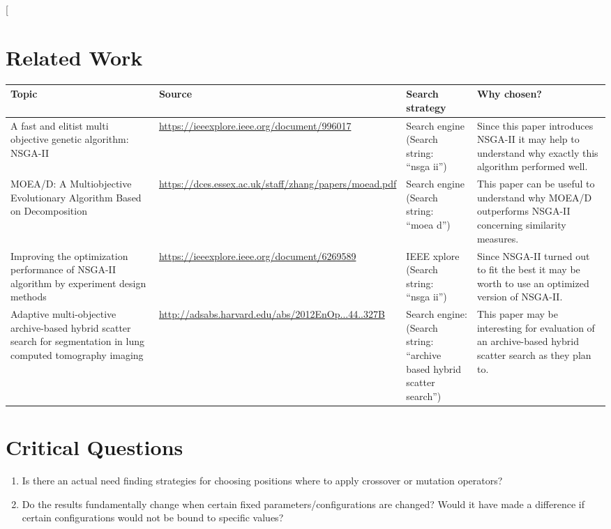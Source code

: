 \documentclass[oneside, notitlepage, twocolumn]{scrartcl}
\newcommand{\tableheadline}[1]{\textbf{#1}}
\begin{document}
\twocolumn[{%
\section{Related Work}
\begin{tabularx}{\textwidth}{XXXX}
    \tableheadline{Topic} & \tableheadline{Source} & \tableheadline{Search strategy} & \tableheadline{Why chosen?}\\
    \midrule
    A fast and elitist multi objective genetic algorithm: NSGA-II & \url{https://ieeexplore.ieee.org/document/996017} & \makecell{Search engine\\(Search string:\\``nsga ii'')} & Since this paper introduces \ac{NSGA-II} it may help to understand why exactly this algorithm performed well.\\
    \midrule
    MOEA/D: A Multiobjective Evolutionary Algorithm Based on Decomposition & \url{https://dces.essex.ac.uk/staff/zhang/papers/moead.pdf} & \makecell{Search engine\\(Search string:\\``moea d'')} & This paper can be useful to understand why \ac{MOEA/D} outperforms \ac{NSGA-II} concerning similarity measures.\\
    \midrule
    Improving the optimization performance of NSGA-II algorithm by experiment design methods & \url{https://ieeexplore.ieee.org/document/6269589} & \makecell{IEEE xplore\\(Search string:\\``nsga ii'')} & Since \ac{NSGA-II} turned out to fit the best it may be worth to use an optimized version of NSGA-II.\\
    \midrule
    Adaptive multi-objective archive-based hybrid scatter search for segmentation in lung computed tomography imaging & \url{http://adsabs.harvard.edu/abs/2012EnOp...44..327B} & \makecell{Search engine:\\(Search string:\\``archive based hybrid scatter search'')} & This paper may be interesting for evaluation of an archive-based hybrid scatter search as they plan to.\\
\end{tabularx}

\section{Critical Questions}
\begin{enumerate}
    \item Is there an actual need finding strategies for choosing positions where to apply crossover or mutation operators?
    \item Do the results fundamentally change when certain fixed parameters/configurations are changed? Would it have made a difference if certain configurations would not be bound to specific values?
\end{enumerate}

}
\end{document}
